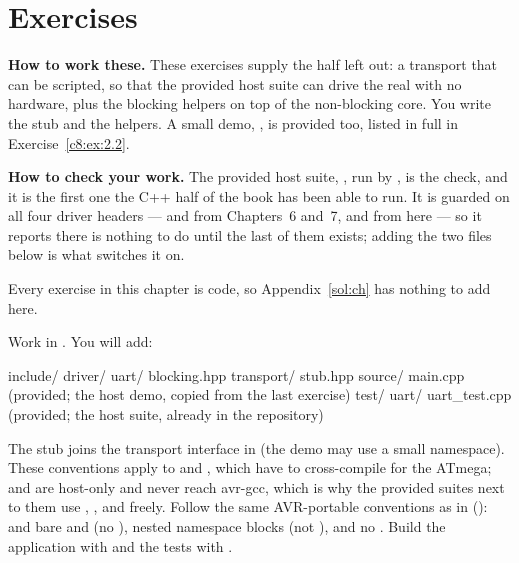 
\section{Exercises}
\label{c8:sec:exercises}\label{c8:app:b}

\begin{aside}
\textbf{How to work these.} These exercises supply the half  left out: a transport that
can be scripted, so that the provided host suite can drive the real  with no hardware,
plus the blocking helpers on top of the non-blocking core. You write the stub and the helpers. A
small demo, , is provided too, listed in full in Exercise~\ref{c8:ex:2.2}.

\textbf{How to check your work.} The provided host suite, , run by
, is the check, and it is the first one the C++ half of the book has been able to
run. It is guarded on all four driver headers ---  and  from
Chapters~6 and~7,  and  from here --- so it reports there is
nothing to do until the last of them exists; adding the two files below is what switches it on.

Every exercise in this chapter is code, so Appendix~\ref{sol:ch} has nothing to add here.
\end{aside}

Work in . You will add:

\begin{console}
include/
    driver/
        uart/
            blocking.hpp
        transport/
            stub.hpp
source/
    main.cpp            (provided; the host demo, copied from the last exercise)
test/
    uart/
        uart_test.cpp   (provided; the host suite, already in the repository)
\end{console}

The stub joins the transport interface in  (the demo may use a small
 namespace). These conventions apply to  and , which have to
cross-compile for the ATmega;  and  are host-only and never
reach avr-gcc, which is why the provided suites next to them use , ,
 and \code{[[nodiscard]]} freely. Follow the same AVR-portable
conventions as in  ():  and bare 
and  (no ), nested namespace blocks (not
), and no \code{[[nodiscard]]}. Build the application with
 and the tests with .

